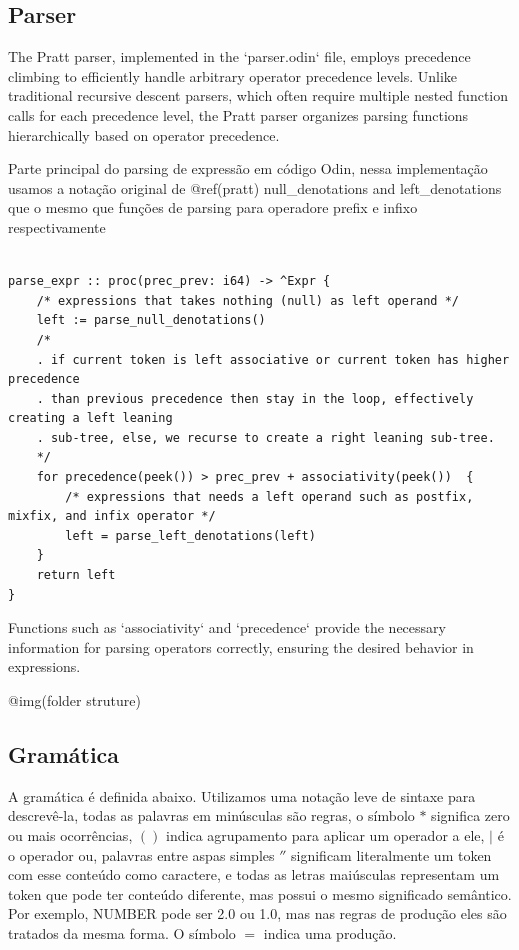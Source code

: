 \documentclass[english, 
               brazil, 
               bsc] %
               {dcomp-abntex2}
\begin{document}
\subsection{Parser}

The Pratt parser, implemented in the `parser.odin` file, employs precedence climbing to efficiently handle arbitrary operator precedence levels. Unlike traditional recursive descent parsers, which often require multiple nested function calls for each precedence level, the Pratt parser organizes parsing functions hierarchically based on operator precedence.



\begin{algoritmo}[H]
  \caption{Parte principal do parsing de expressão em código Odin, nessa implementação usamos a notação original de @ref(pratt) null\_denotations and left\_denotations que o mesmo que funções de parsing para operadore prefix e infixo respectivamente}
	\label{alg1}
	\label{alg1}
  \begin{lstlisting}

parse_expr :: proc(prec_prev: i64) -> ^Expr {
    /* expressions that takes nothing (null) as left operand */
    left := parse_null_denotations() 
    /*
    . if current token is left associative or current token has higher precedence
    . than previous precedence then stay in the loop, effectively creating a left leaning
    . sub-tree, else, we recurse to create a right leaning sub-tree.
    */
    for precedence(peek()) > prec_prev + associativity(peek())  {
        /* expressions that needs a left operand such as postfix, mixfix, and infix operator */
        left = parse_left_denotations(left)
    }
    return left
}

  \end{lstlisting}
\end{algoritmo}

Functions such as `associativity` and `precedence` provide the necessary information for parsing operators correctly, ensuring the desired behavior in expressions.

@img(folder struture)
\subsection{Gramática}

A gramática é definida abaixo. Utilizamos uma notação leve de sintaxe para descrevê-la, todas as palavras em minúsculas são regras, o símbolo $*$ significa zero ou mais ocorrências, $()$ indica agrupamento para aplicar um operador a ele, $|$ é o operador ou, palavras entre aspas simples $''$ significam literalmente um token com esse conteúdo como caractere, e todas as letras maiúsculas representam um token que pode ter conteúdo diferente, mas possui o mesmo significado semântico. Por exemplo, NUMBER pode ser 2.0 ou 1.0, mas nas regras de produção eles são tratados da mesma forma. O símbolo $=$ indica uma produção.
\end{document}
